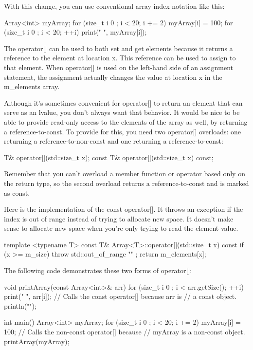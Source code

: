 With this change, you can use conventional array index notation like this:

\begin{cpp}
Array<int> myArray;
for (size_t i { 0 }; i < 20; i += 2) {
    myArray[i] = 100;
}
for (size_t i { 0 }; i < 20; ++i) {
    print("{} ", myArray[i]);
}
\end{cpp}

The operator[] can be used to both set and get elements because it returns a reference to the element at location x. This reference can be used to assign to that element. When operator[] is used on the left-hand side of an assignment statement, the assignment actually changes the value at location x in the m\_elements array.


Although it’s sometimes convenient for operator[] to return an element that can serve as an lvalue, you don’t always want that behavior. It would be nice to be able to provide read-only access to the elements of the array as well, by returning a reference-to-const. To provide for this, you need two operator[] overloads: one returning a reference-to-non-const and one returning a reference-to-const:

\begin{cpp}
T& operator[](std::size_t x);
const T& operator[](std::size_t x) const;
\end{cpp}

Remember that you can’t overload a member function or operator based only on the return type, so the second overload returns a reference-to-const and is marked as const.

Here is the implementation of the const operator[]. It throws an exception if the index is out of range instead of trying to allocate new space. It doesn’t make sense to allocate new space when you’re only trying to read the element value.

\begin{cpp}
template <typename T> const T& Array<T>::operator[](std::size_t x) const
{
    if (x >= m_size) { throw std::out_of_range { "" }; }
    return m_elements[x];
}
\end{cpp}

The following code demonstrates these two forms of operator[]:

\begin{cpp}
void printArray(const Array<int>& arr)
{
    for (size_t i { 0 }; i < arr.getSize(); ++i) {
        print("{} ", arr[i]); // Calls the const operator[] because arr is
                              // a const object.
    }
    println("");
}

int main()
{
    Array<int> myArray;
    for (size_t i { 0 }; i < 20; i += 2) {
        myArray[i] = 100; // Calls the non-const operator[] because
                          // myArray is a non-const object.
    }
    printArray(myArray);
}
\end{cpp}

